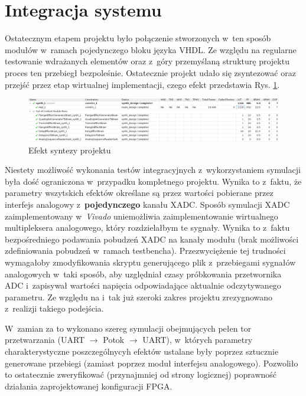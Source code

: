 \section{Integracja systemu}

Ostatecznym etapem projektu było połączenie stworzonych w~ten sposób modułów w~ramach pojedynczego bloku języka VHDL. Ze względu na regularne testowanie wdrażanych elementów oraz z~góry przemyślaną strukturę projektu proces ten przebiegł bezpoleśnie. Ostatecznie projekt udało się zsyntezować oraz przejść przez etap wirtualnej implementacji, czego efekt przedstawia Rys. \ref{synthesis}.

\vspace{1cm}
\begin{figure}[ht]
    \centering
    \includegraphics[width=\textwidth]{img/implementation.png}
    \captionsetup{format=plain,justification=centering}
    \caption{Efekt syntezy projektu}
    \label{synthesis}
\end{figure}
\vspace{1cm}

Niestety możliwość wykonania testów integracyjnych z~wykorzystaniem symulacji była dość ograniczona w~przypadku kompletnego projektu. Wynika to z~faktu, że parametry wszytskich efektów określane są przez wartości pobierane przez interfejs analogowy z~\textbf{pojedynczego} kanału XADC. Sposób symulacji XADC zaimplementowany w~\textit{Vivado} uniemożliwia zaimplementowanie wirtualnego multipleksera analogowego, który rozdzielałbym te sygnały. Wynika to z~faktu bezpośredniego podawania pobudzeń XADC na kanały modułu (brak możliwości zdefiniowania pobudzeń w~ramach testbencha). Przezwyciężenie tej trudności wymagałoby zmodyfikowania skryptu generującego plik z~przebiegami sygnałów analogowych w~taki sposób, aby uzględniał czasy próbkowania przetwornika ADC i~zapisywał wartości napięcia odpowiadające aktualnie odczytywanego parametru. Ze względu na i~tak już szeroki zakres projektu zrezygnowano z~realizji takiego podejścia.

W~zamian za to wykonano szereg symulacji obejmujących pełen tor przetwarzania (UART $\rightarrow$ Potok $\rightarrow$ UART), w~których parametry charakterystyczne poszczególnycyh efektów ustalane były poprzez sztucznie generowane przebiegi (zamiast poprzez moduł interfejsu analogowego). Pozwoliło to ostatecznie zweryfikować (przynajmniej od strony logicznej) poprawność działania zaprojektowanej konfiguracji FPGA. 

